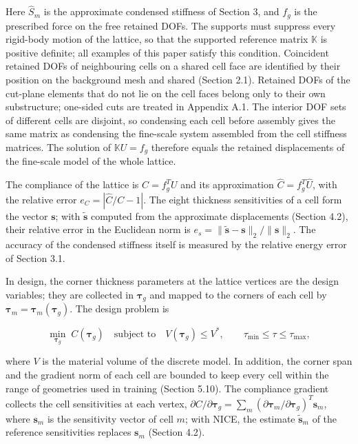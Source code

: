 \documentclass[preprint,12pt,authoryear]{elsarticle}
\begin{document}
Here \(\widehat S_m\) is the approximate condensed stiffness of Section 3, and \(f_g\) is the prescribed force on the free retained DOFs. The supports must suppress every rigid-body motion of the lattice, so that the supported reference matrix \(\mathbb K\) is positive definite; all examples of this paper satisfy this condition. Coincident retained DOFs of neighbouring cells on a shared cell face are identified by their position on the background mesh and shared (Section 2.1). Retained DOFs of the cut-plane elements that do not lie on the cell faces belong only to their own substructure; one-sided cuts are treated in Appendix A.1. The interior DOF sets of different cells are disjoint, so condensing each cell before assembly gives the same matrix as condensing the fine-scale system assembled from the cell stiffness matrices. The solution of \(\mathbb KU=f_g\) therefore equals the retained displacements of the fine-scale model of the whole lattice.

The compliance of the lattice is \(C=f_g^TU\) and its approximation \(\widehat C=f_g^T\widehat U\), with the relative error \(e_C=|\widehat C/C-1|\). The eight thickness sensitivities of a cell form the vector \(\boldsymbol s\); with \(\widetilde{\boldsymbol s}\) computed from the approximate displacements (Section 4.2), their relative error in the Euclidean norm is \(e_s=\|\widetilde{\boldsymbol s}-\boldsymbol s\|_2/\|\boldsymbol s\|_2\). The accuracy of the condensed stiffness itself is measured by the relative energy error of Section 3.1.

In design, the corner thickness parameters at the lattice vertices are the design variables; they are collected in \(\boldsymbol\tau_g\) and mapped to the corners of each cell by \(\boldsymbol\tau_m=\boldsymbol\tau_m(\boldsymbol\tau_g)\). The design problem is

\[
\min_{\boldsymbol\tau_g}\;C(\boldsymbol\tau_g)\quad\text{subject to}\quad V(\boldsymbol\tau_g)\le V^*,\qquad \tau_{\min}\le\tau\le\tau_{\max},
\]

where \(V\) is the material volume of the discrete model. In addition, the corner span and the gradient norm of each cell are bounded to keep every cell within the range of geometries used in training (Section 5.10). The compliance gradient collects the cell sensitivities at each vertex, \(\partial C/\partial\boldsymbol\tau_g=\sum_m(\partial\boldsymbol\tau_m/\partial\boldsymbol\tau_g)^T\boldsymbol s_m\), where \(\boldsymbol s_m\) is the sensitivity vector of cell \(m\); with NICE, the estimate \(\widetilde{\boldsymbol s}_m\) of the reference sensitivities replaces \(\boldsymbol s_m\) (Section 4.2).
\end{document}
